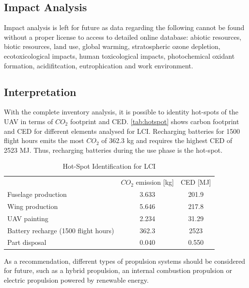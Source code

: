 \subsection{Impact Analysis}
Impact analysis is left for future as data regarding the following cannot be found without a proper license to access to detailed online database: abiotic resources, biotic resources, land use, global warming, stratospheric ozone depletion, ecotoxicological impacts, human toxicological impacts, photochemical oxidant formation, acidifitcation, eutrophication and work environment.


\subsection{Interpretation}
With the complete inventory analysis, it is possible to identity hot-spots of the UAV in terms of $CO_{2}$ footprint and CED. \autoref{tab:hotspot} shows carbon footprint and CED for different elements analysed for LCI. Recharging batteries for 1500 flight hours emits the most $CO_{2}$ of 362.3 kg and requires the highest CED of 2523 MJ. Thus, recharging batteries during the use phase is the hot-spot.


\begin{table}[H]
\centering
\caption{Hot-Spot Identification for LCI}
    \label{tab:hotspot}
    \begin{tabular}{l|cc}
    \toprule
                                           & $CO_{2}$ emission [kg]        & CED [MJ]                     \\\hdashline
    Fuselage production                    & 3.633                         & 201.9                        \\\hdashline
    Wing production                        & 5.646                         & 217.8                        \\\hdashline
    UAV painting                           & 2.234                         & 31.29                        \\\hdashline
    Battery recharge (1500 flight hours) & \cellcolor[HTML]{FE0000}362.3 & \cellcolor[HTML]{FE0000}2523 \\\hdashline
    Part disposal                          & 0.040                         & 0.550   \\\bottomrule                    
    \end{tabular}
\end{table}

As a recommendation, different types of propulsion systems should be considered for future, such as a hybrid propulsion, an internal combustion propulsion or electric propulsion powered by renewable energy. 



